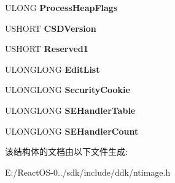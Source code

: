 \begin{DoxyCompactItemize}
U\+L\+O\+NG {\bfseries Process\+Heap\+Flags}
\item 
\mbox{\label{struct_i_m_a_g_e___l_o_a_d___c_o_n_f_i_g___d_i_r_e_c_t_o_r_y64_a216752cec2b2bb751998f2553e4dfbb1}} 
U\+S\+H\+O\+RT {\bfseries C\+S\+D\+Version}
\item 
\mbox{\label{struct_i_m_a_g_e___l_o_a_d___c_o_n_f_i_g___d_i_r_e_c_t_o_r_y64_a076ba5272f0fe6d521cbce09e1876fcd}} 
U\+S\+H\+O\+RT {\bfseries Reserved1}
\item 
\mbox{\label{struct_i_m_a_g_e___l_o_a_d___c_o_n_f_i_g___d_i_r_e_c_t_o_r_y64_a9d0ab17a4a7048b628ed655771d24a1b}} 
U\+L\+O\+N\+G\+L\+O\+NG {\bfseries Edit\+List}
\item 
\mbox{\label{struct_i_m_a_g_e___l_o_a_d___c_o_n_f_i_g___d_i_r_e_c_t_o_r_y64_af1d1cc763124502f14d6d6fd288b8e12}} 
U\+L\+O\+N\+G\+L\+O\+NG {\bfseries Security\+Cookie}
\item 
\mbox{\label{struct_i_m_a_g_e___l_o_a_d___c_o_n_f_i_g___d_i_r_e_c_t_o_r_y64_a58e84f9da2e68a7137adaf837557af1e}} 
U\+L\+O\+N\+G\+L\+O\+NG {\bfseries S\+E\+Handler\+Table}
\item 
\mbox{\label{struct_i_m_a_g_e___l_o_a_d___c_o_n_f_i_g___d_i_r_e_c_t_o_r_y64_ab6909cca14d441e62cd347fe22501592}} 
U\+L\+O\+N\+G\+L\+O\+NG {\bfseries S\+E\+Handler\+Count}
\end{DoxyCompactItemize}


该结构体的文档由以下文件生成\+:\begin{DoxyCompactItemize}
\item 
E\+:/\+React\+O\+S-\/0../sdk/include/ddk/ntimage.\+h\end{DoxyCompactItemize}
